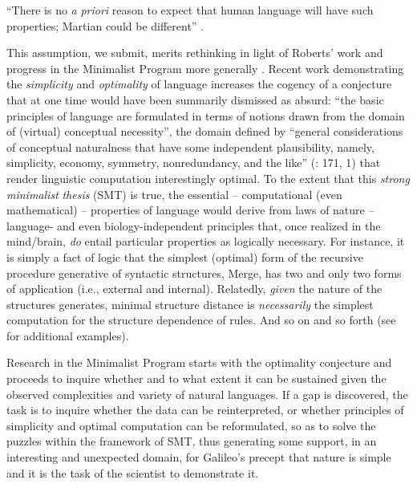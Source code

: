 \documentclass[output=paper]{langsci/langscibook}
\begin{document}
“There is no \emph{a} \emph{priori} reason to expect that human language will
have such properties; Martian could be different” \citep[16]{Chomsky2000}.

This assumption, we submit, merits rethinking in light of Roberts’ work and
progress in the Minimalist Program more generally \citep{Chomsky1995}. Recent
work demonstrating the \emph{simplicity} \parencite{WatChoRob2017} and
\emph{optimality} \citep{ChoGalOtt2019} of language increases the cogency of
a conjecture that at one time would have been summarily dismissed as absurd:
“the basic principles of language are formulated in terms of notions drawn from
the domain of (virtual) conceptual necessity”, the domain defined by “general
considerations of conceptual naturalness that have some independent
plausibility, namely, simplicity, economy, symmetry, nonredundancy, and the
like” (\citealt{Chomsky1995}: 171, 1) that render linguistic computation
interestingly optimal. To the extent that this \emph{strong} \emph{minimalist}
\emph{thesis} (\gls{SMT}) is true,
the essential – computational (even mathematical) – properties of language
would derive from laws of nature – language- and even biology-independent
principles that, once realized in the mind/brain, \emph{do} entail particular
properties as logically necessary. For instance, it is simply a fact of logic
that the simplest (optimal) form of the recursive procedure generative of
syntactic structures, Merge, has two and only two forms of application (i.e.,
external and internal).  Relatedly, \emph{given} the nature of the structures
 generates, minimal structure distance is \emph{necessarily} the
simplest computation for the structure dependence of rules. And so on and so
forth (see \citealt{BerwickEtAl2011,Chomsky2013,Watumull2015} for additional
examples).

Research in the Minimalist Program starts with the optimality conjecture and
proceeds to inquire whether and to what extent it can be sustained given the
observed complexities and variety of natural languages. If a gap is discovered,
the task is to inquire whether the data can be reinterpreted, or whether
principles of simplicity and optimal computation can be reformulated, so as to
solve the puzzles within the framework of \gls{SMT}, thus generating some support, in
an interesting and unexpected domain, for Galileo’s precept that nature is
simple and it is the task of the scientist to demonstrate it.
\end{document}
